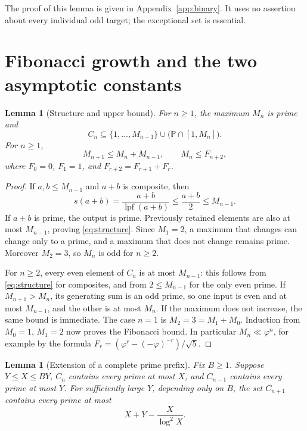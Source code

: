\documentclass[11pt,letterpaper]{article}
\numberwithin{equation}{section}
\newtheorem{lemma}[theorem]{Lemma}
\theoremstyle{remark}
\DeclareMathOperator{\lpf}{lpf}
\newcommand{\Pp}{\mathbb P}
\newcommand{\ph}{\varphi}
\begin{document}
The proof of this lemma is given in Appendix~\ref{app:binary}. It uses no assertion
about every individual odd target; the exceptional set is essential.

\section{Fibonacci growth and the two asymptotic constants}

\begin{lemma}[Structure and upper bound]\label{lem:structure}
For $n\ge1$, the maximum $M_n$ is prime and
\begin{equation}\label{eq:structure}
 C_n\subseteq\{1,\ldots,M_{n-1}\}
       \cup\bigl(\Pp\cap[1,M_n]\bigr).
\end{equation}
For $n\ge1$,
\begin{equation}\label{eq:fib-upper}
 M_{n+1}\le M_n+M_{n-1},\qquad M_n\le F_{n+2},
\end{equation}
where $F_0=0$, $F_1=1$, and $F_{r+2}=F_{r+1}+F_r$.
\end{lemma}

\begin{proof}
If $a,b\le M_{n-1}$ and $a+b$ is composite, then
\[
 s(a+b)=\frac{a+b}{\lpf(a+b)}\le\frac{a+b}{2}\le M_{n-1}.
\]
If $a+b$ is prime, the output is prime. Previously retained elements
are also at most $M_{n-1}$, proving \eqref{eq:structure}. Since
$M_1=2$, a maximum that changes can change only to a prime, and a
maximum that does not change remains prime. Moreover $M_2=3$, so
$M_n$ is odd for $n\ge2$.

For $n\ge2$, every even element of $C_n$ is at most $M_{n-1}$:
this follows from \eqref{eq:structure} for composites, and from
$2\le M_{n-1}$ for the only even prime. If $M_{n+1}>M_n$, its
generating sum is an odd prime, so one input is even and at most
$M_{n-1}$, and the other is at most $M_n$. If the maximum does not
increase, the same bound is immediate. The case $n=1$ is
$M_2=3=M_1+M_0$. Induction from $M_0=1$, $M_1=2$ now proves
the Fibonacci bound. In particular $M_n\ll\ph^n$, for example by
the formula $F_r=(\ph^r-(-\ph)^{-r})/\sqrt5$.
\end{proof}

\begin{lemma}[Extension of a complete prime prefix]\label{lem:extension}
Fix $B\ge1$. Suppose $Y\le X\le BY$, $C_n$ contains every prime
at most $X$, and $C_{n-1}$ contains every prime at most $Y$.
For sufficiently large $Y$, depending only on $B$, the set $C_{n+1}$
contains every prime at most
\begin{equation}\label{eq:extension}
 X+Y-\frac{X}{\log^2X}.
\end{equation}
\end{lemma}
\end{document}
